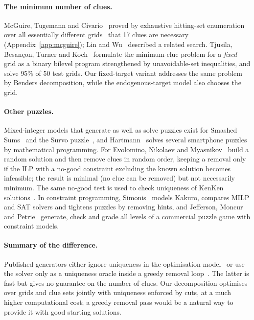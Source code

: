 \documentclass[11pt]{article}
\begin{document}
\paragraph{The minimum number of clues.} McGuire, Tugemann and Civario~\cite{mcguire} proved by exhaustive hitting-set enumeration over all essentially different grids~\cite{russelljarvis} that 17 clues are necessary (Appendix~\ref{app:mcguire}); Lin and Wu~\cite{linwu} described a related search. Tjusila, Besan\c{c}on, Turner and Koch~\cite{bilevel} formulate the minimum-clue problem for a \emph{fixed} grid as a binary bilevel program strengthened by unavoidable-set inequalities, and solve 95\% of 50 test grids. Our fixed-target variant addresses the same problem by Benders decomposition, while the endogenous-target model also chooses the grid.

\paragraph{Other puzzles.} Mixed-integer models that generate as well as solve puzzles exist for Smashed Sums~\cite{kececi} and the Survo puzzle~\cite{sungur}, and Hartmann~\cite{hartmann18,hartmann19} solves several smartphone puzzles by mathematical programming. For Evolomino, Nikolaev and Myasnikov~\cite{nikolaev} build a random solution and then remove clues in random order, keeping a removal only if the ILP with a no-good constraint excluding the known solution becomes infeasible; the result is minimal (no clue can be removed) but not necessarily minimum. The same no-good test is used to check uniqueness of KenKen solutions~\cite{kalvelagen}. In constraint programming, Simonis~\cite{simonis} models Kakuro, compares MILP and SAT solvers and tightens puzzles by removing hints, and Jefferson, Moncur and Petrie~\cite{jefferson} generate, check and grade all levels of a commercial puzzle game with constraint models.

\paragraph{Summary of the difference.} Published generators either ignore uniqueness in the optimisation model~\cite{ates} or use the solver only as a uniqueness oracle inside a greedy removal loop~\cite{nikolaev,simonis}. The latter is fast but gives no guarantee on the number of clues. Our decomposition optimises over grids and clue sets jointly with uniqueness enforced by cuts, at a much higher computational cost; a greedy removal pass would be a natural way to provide it with good starting solutions.
\end{document}
